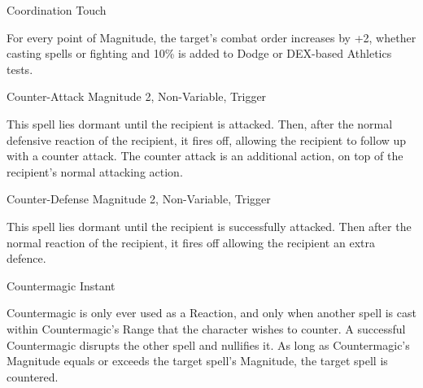 \begin{rpg-spell}
{Coordination}
{Touch}

For every point of Magnitude, the target’s combat order increases by +2, whether casting spells or fighting and 10\% is added to Dodge or DEX-based Athletics tests. 
\end{rpg-spell}


\begin{rpg-spell}
{Counter-Attack}
{Magnitude 2, Non-Variable, Trigger}

This spell lies dormant until the recipient is attacked. Then, after the normal defensive reaction of the recipient, it fires off, allowing the recipient to follow up with a counter attack. The counter attack is an additional action, on top of the recipient’s normal attacking action.
\end{rpg-spell}


\begin{rpg-spell}
{Counter-Defense}
{Magnitude 2, Non-Variable, Trigger}

This spell lies dormant until the recipient is successfully attacked. Then after the normal reaction of the recipient, it fires off allowing the recipient an extra defence.
\end{rpg-spell}



\begin{rpg-spell}
{Countermagic}
{Instant}

Countermagic is only ever used as a Reaction, and only when another spell is cast within Countermagic’s Range that the character wishes to counter. A successful Countermagic disrupts the other spell and nullifies it. As long as Countermagic’s Magnitude equals or exceeds the target spell’s Magnitude, the target spell is countered.
\end{rpg-spell}


